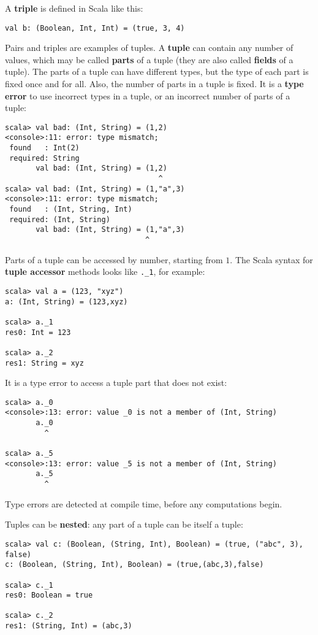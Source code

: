 A \textbf{triple} is defined in Scala like this:
\begin{lstlisting}
val b: (Boolean, Int, Int) = (true, 3, 4)
\end{lstlisting}
Pairs and triples are examples of tuples. A \textbf{tuple} can contain
any number of values, which may be called \textbf{parts}
of a tuple (they are also called \textbf{fields} of
a tuple). The parts of a tuple can have different types, but the type
of each part is fixed once and for all. Also, the number of parts
in a tuple is fixed. It is a \textbf{type error}
to use incorrect types in a tuple, or an incorrect number of parts
of a tuple:
\begin{lstlisting}
scala> val bad: (Int, String) = (1,2)
<console>:11: error: type mismatch;
 found   : Int(2)
 required: String
       val bad: (Int, String) = (1,2)
                                   ^
scala> val bad: (Int, String) = (1,"a",3)
<console>:11: error: type mismatch;
 found   : (Int, String, Int)
 required: (Int, String)
       val bad: (Int, String) = (1,"a",3)
                                ^
\end{lstlisting}
Parts of a tuple can be accessed by number, starting from $1$. The
Scala syntax for \textbf{tuple accessor} methods
looks like \lstinline!._1!, for example:
\begin{lstlisting}
scala> val a = (123, "xyz")
a: (Int, String) = (123,xyz)

scala> a._1
res0: Int = 123

scala> a._2
res1: String = xyz 
\end{lstlisting}
It is a type error to access a tuple part that does not exist:
\begin{lstlisting}
scala> a._0
<console>:13: error: value _0 is not a member of (Int, String)
       a._0
         ^

scala> a._5
<console>:13: error: value _5 is not a member of (Int, String)
       a._5
         ^
\end{lstlisting}
Type errors are detected at compile time, before
any computations begin.

Tuples can be \textbf{nested}: any part of a
tuple can be itself a tuple:
\begin{lstlisting}
scala> val c: (Boolean, (String, Int), Boolean) = (true, ("abc", 3), false)
c: (Boolean, (String, Int), Boolean) = (true,(abc,3),false)

scala> c._1
res0: Boolean = true

scala> c._2
res1: (String, Int) = (abc,3)
\end{lstlisting}

